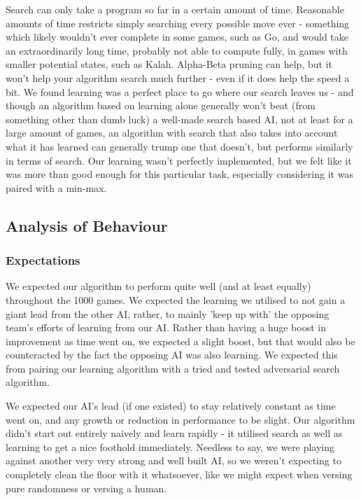 \documentclass[11pt]{article}
\begin{document}
Search can only take a program so far in a certain amount of time. Reasonable amounts of time restricts simply searching every possible move ever - something which likely wouldn't ever complete in some games, such as Go, and would take an extraordinarily long time, probably not able to compute fully, in games with smaller potential states, such as Kalah. Alpha-Beta pruning can help, but it won't help your algorithm search much further - even if it does help the speed a bit. We found learning was a perfect place to go where our search leaves us - and though an algorithm based on learning alone generally won't beat (from something other than dumb luck) a well-made search based AI, not at least for a large amount of games, an algorithm with search that also takes into account what it has learned can generally trump one that doesn't, but performs similarly in terms of search. Our learning wasn't perfectly implemented, but we felt like it was more than good enough for this particular task, especially considering it was paired with a min-max.
\subsection{Analysis of Behaviour}
\label{sec-3-3}

\subsubsection{Expectations}
\label{sec-3-3-1}

We expected our algorithm to perform quite well (and at least equally) throughout the 1000 games. We expected the learning we utilised to not gain a giant lead from the other AI, rather, to mainly 'keep up with' the opposing team's efforts of learning from our AI. Rather than having a huge boost in improvement as time went on, we expected a slight boost, but that would also be counteracted by the fact the opposing AI was also learning. We expected this from pairing our learning algorithm with a tried and tested adversarial search algorithm.

We expected our AI's lead (if one existed) to stay relatively constant as time went on, and any growth or reduction in performance to be slight. Our algorithm didn't start out entirely naively and learn rapidly - it utilised search as well as learning to get a nice foothold immediately. Needless to say, we were playing against another very very strong and well built AI, so we weren't expecting to completely clean the floor with it whatsoever, like we might expect when versing pure randomness or versing a human.
\end{document}
